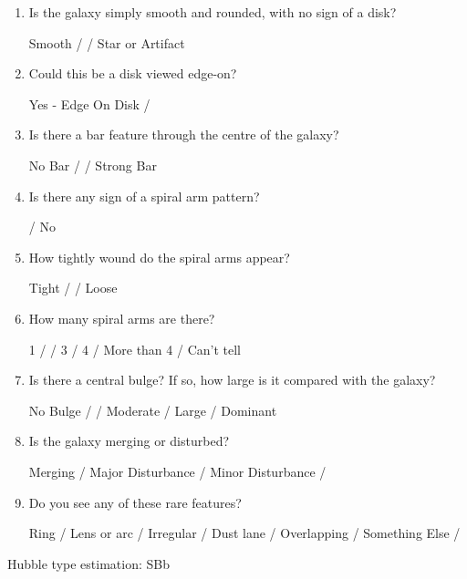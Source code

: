\documentclass[11pt,letterpaper]{article}
\begin{document}
\begin{enumerate}

    \item Is the galaxy simply smooth and rounded, with no sign of a disk?

        Smooth /  / Star or Artifact

    \item Could this be a disk viewed edge-on?

Yes - Edge On Disk / 

\item Is there a bar feature through the centre of the galaxy?

No Bar /  / Strong Bar

\item Is there any sign of a spiral arm pattern?

 / No

\item How tightly wound do the spiral arms appear?

Tight /  / Loose 

\item How many spiral arms are there?

1 /  / 3 / 4 / More than 4 / Can't tell

\item Is there a central bulge? If so, how large is it compared with the galaxy?

No Bulge /  / Moderate / Large / Dominant

\item Is the galaxy merging or disturbed?

Merging / Major Disturbance / Minor Disturbance / 

\item Do you see any of these rare features?

    Ring / Lens or arc / Irregular / Dust lane / Overlapping / Something Else /  
\end{enumerate}

Hubble type estimation: SBb

\newpage
\end{document}
